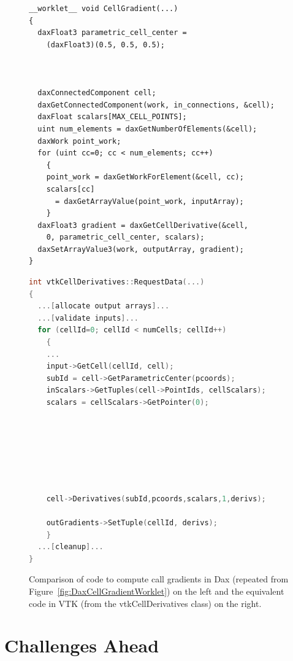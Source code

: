 \documentclass{vgtc}                          %
\begin{document}
\begin{figure}
  \centering
  \begin{minipage}[t]{.49\linewidth}
    \begin{lstlisting}[language=Dax]
__worklet__ void CellGradient(...)
{
  daxFloat3 parametric_cell_center =
    (daxFloat3)(0.5, 0.5, 0.5);



  daxConnectedComponent cell;
  daxGetConnectedComponent(work, in_connections, &cell);
  daxFloat scalars[MAX_CELL_POINTS];
  uint num_elements = daxGetNumberOfElements(&cell);
  daxWork point_work;
  for (uint cc=0; cc < num_elements; cc++)
    {
    point_work = daxGetWorkForElement(&cell, cc);
    scalars[cc]
      = daxGetArrayValue(point_work, inputArray);
    }
  daxFloat3 gradient = daxGetCellDerivative(&cell,
    0, parametric_cell_center, scalars);
  daxSetArrayValue3(work, outputArray, gradient);
}
    \end{lstlisting}
  \end{minipage}
  \begin{minipage}[t]{.49\linewidth}
    \begin{lstlisting}[language=C++]
int vtkCellDerivatives::RequestData(...)
{
  ...[allocate output arrays]...
  ...[validate inputs]...
  for (cellId=0; cellId < numCells; cellId++)
    {
    ...
    input->GetCell(cellId, cell);
    subId = cell->GetParametricCenter(pcoords);
    inScalars->GetTuples(cell->PointIds, cellScalars);
    scalars = cellScalars->GetPointer(0);







    cell->Derivatives(subId,pcoords,scalars,1,derivs);

    outGradients->SetTuple(cellId, derivs);
    }
  ...[cleanup]...
}
    \end{lstlisting}
  \end{minipage}
  \caption{Comparison of code to compute call gradients in Dax (repeated
    from Figure~\ref{fig:DaxCellGradientWorklet}) on the left and the
    equivalent code in VTK (from the vtkCellDerivatives class) on the
    right.}
  \label{fig:DaxVTKCompare}
\end{figure}

\section{Challenges Ahead}
\label{sec:Challenges}
\end{document}
